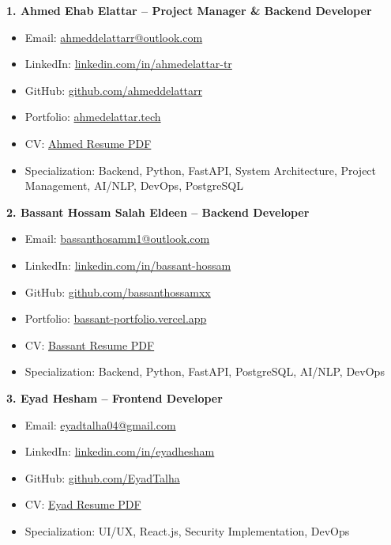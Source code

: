 \documentclass[12pt,a4paper]{article}
\begin{document}
\textbf{1. Ahmed Ehab Elattar – Project Manager \& Backend Developer}  
\begin{itemize}
    \item Email: \href{mailto:ahmeddelattarr@outlook.com}{ahmeddelattarr@outlook.com}
    \item LinkedIn: \href{https://www.linkedin.com/in/ahmedelattar-tr}{linkedin.com/in/ahmedelattar-tr}
    \item GitHub: \href{https://github.com/ahmeddelattarr}{github.com/ahmeddelattarr}
    \item Portfolio: \href{https://www.ahmedelattar.tech}{ahmedelattar.tech}
    \item CV: \href{https://www.ahmedelattar.tech/resume.pdf}{Ahmed Resume PDF}
    \item Specialization: Backend, Python, FastAPI, System Architecture, Project Management, AI/NLP, DevOps, PostgreSQL
\end{itemize}

\textbf{2. Bassant Hossam Salah Eldeen – Backend Developer}  
\begin{itemize}
    \item Email: \href{mailto:bassanthosamm1@outlook.com}{bassanthosamm1@outlook.com}
    \item LinkedIn: \href{https://www.linkedin.com/in/bassant-hossam-5a4177264}{linkedin.com/in/bassant-hossam}
    \item GitHub: \href{https://github.com/Bassanthossamxx}{github.com/bassanthossamxx}
    \item Portfolio: \href{https://bassant-portfolio.vercel.app}{bassant-portfolio.vercel.app}
    \item CV: \href{https://bassant-portfolio.vercel.app/assets/Bassant_Hossam_CV.pdf}{Bassant Resume PDF}
    \item Specialization: Backend, Python, FastAPI, PostgreSQL, AI/NLP, DevOps
\end{itemize}

\textbf{3. Eyad Hesham – Frontend Developer}  
\begin{itemize}
    \item Email: \href{mailto:eyadtalha04@gmail.com}{eyadtalha04@gmail.com}
    \item LinkedIn: \href{https://www.linkedin.com/in/eyadhesham}{linkedin.com/in/eyadhesham}
    \item GitHub: \href{https://github.com/EyadTalha}{github.com/EyadTalha}
    \item CV: \href{https://drive.google.com/file/d/1gIWggXZtLGkVX9wEBdzE1umS1afZiNBz/view?usp=sharing}{Eyad Resume PDF}
    \item Specialization: UI/UX, React.js, Security Implementation, DevOps
\end{itemize}
\end{document}
